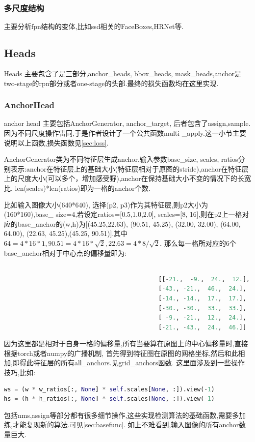 \documentclass[UTF8]{ctexart}
\begin{document}
\subsubsection{多尺度结构}
主要分析fpn结构的变体,比如ssd相关的FaceBoxes,HRNet等.


\subsection{Heads}
Heads 主要包含了是三部分,anchor\_heads, bbox\_heads, mask\_heads,anchor是two-stage的rpn部分或者one-stage的头部.最终的损失函数均在这里实现.

\subsubsection{AnchorHead}
\label{sub:anchorhead}
anchor head 主要包括AnchorGenerator, anchor\_target, 后者包含了assign,sample.因为不同尺度操作雷同,于是作者设计了一个公共函数multi
\_apply.这一小节主要说明以上函数,损失函数见\ref{sec:loss}.

AnchorGenerator类为不同特征层生成anchor,输入参数base\_size, scales, ratios分别表示:anchor在特征层上的基础大小(特征层相对于原图的stride),anchor在特征层上的尺度大小(可以多个，增加感受野),anchor在保持基础大小不变的情况下的长宽比.
len(scales)*len(ratios)即为一格的anchor个数.

比如输入图像大小(640*640), 选择(p2, p3)作为其特征层,则p2大小为(160*160),base\_ size=4,若设定ratios=[0.5,1.0,2.0], scales=[8, 16],则在p2上一格对应的base\_anchor的(w,h)为[(45.25,22.63),  (90.51, 45.25),
 (32.00, 32.00),  (64.00, 64.00), (22.63, 45.25),(45.25, 90.51)].其中$64=4*16*1,90.51=4*16*\sqrt{2}, 22.63=4*8/\sqrt{2}.$
 那么每一格所对应的6个base\_anchor相对于中心点的偏移量即为:
\lstset{style=mystyle}
\begin{lstlisting}[language=Python]
	
											[[-21.,  -9.,  24.,  12.],
											[-43., -21.,  46.,  24.],
											[-14., -14.,  17.,  17.],
											[-30., -30.,  33.,  33.],
											[ -9., -21.,  12.,  24.],
											[-21., -43.,  24.,  46.]]

\end{lstlisting}

因为这里都是相对于自身一格的偏移量,所有当要算在原图上的中心偏移量时,直接根据torch或者numpy的广播机制,
首先得到特征图在原图的网格坐标,然后和此相加,即得此特征层的所有all\_anchors.见grid\_anchors函数.
这里面涉及到一些操作技巧,比如:
\lstset{style=mystyle}
\begin{lstlisting}[language=Python]
ws = (w * w_ratios[:, None] * self.scales[None, :]).view(-1)
hs = (h * h_ratios[:, None] * self.scales[None, :]).view(-1)
\end{lstlisting}
包括nms,assign等部分都有很多细节操作,这些实现检测算法的基础函数,需要多加练,才能复现新的算法.可见\ref{sec:basefunc}.
如上不难看到,输入图像的所有anchor数量巨大.
\end{document}
